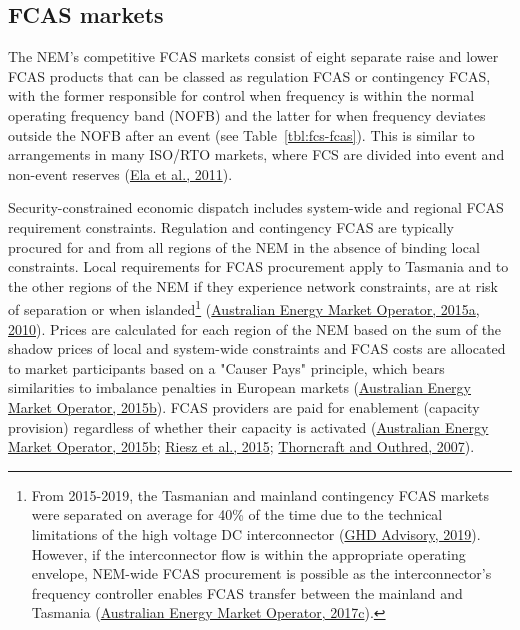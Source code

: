 \documentclass[12pt,a4paper,]{report}
\begin{document}
\hypertarget{fcas-markets}{%
\subsection{FCAS markets}\label{fcas-markets}}

The NEM's competitive FCAS markets consist of eight separate raise and
lower FCAS products that can be classed as regulation FCAS or
contingency FCAS, with the former responsible for control when frequency
is within the normal operating frequency band (NOFB) and the latter for
when frequency deviates outside the NOFB after an event (see
Table~\ref{tbl:fcs-fcas}). This is similar to arrangements in many
ISO/RTO markets, where FCS are divided into event and non-event reserves
(\protect\hyperlink{ref-elaOperatingReservesVariable2011}{Ela et al.,
2011}).

Security-constrained economic dispatch includes system-wide and regional
FCAS requirement constraints. Regulation and contingency FCAS are
typically procured for and from all regions of the NEM in the absence of
binding local constraints. Local requirements for FCAS procurement apply
to Tasmania and to the other regions of the NEM if they experience
network constraints, are at risk of separation or when
islanded\footnote{From 2015-2019, the Tasmanian and mainland contingency
  FCAS markets were separated on average for 40\% of the time due to the
  technical limitations of the high voltage DC interconnector
  (\protect\hyperlink{ref-ghdadvisoryGHDReportTasNetworks2019}{GHD
  Advisory, 2019}). However, if the interconnector flow is within the
  appropriate operating envelope, NEM-wide FCAS procurement is possible
  as the interconnector's frequency controller enables FCAS transfer
  between the mainland and Tasmania
  (\protect\hyperlink{ref-australianenergymarketoperatorInterconnectorCapabilitiesNational2017}{Australian
  Energy Market Operator, 2017c}).}
(\protect\hyperlink{ref-australianenergymarketoperatorConstraintImplementationGuidelines2015}{Australian
Energy Market Operator, 2015a},
\protect\hyperlink{ref-australianenergymarketoperatorConstraintFormulationGuidelines2010}{2010}).
Prices are calculated for each region of the NEM based on the sum of the
shadow prices of local and system-wide constraints and FCAS costs are
allocated to market participants based on a "Causer Pays" principle,
which bears similarities to imbalance penalties in European markets
(\protect\hyperlink{ref-australianenergymarketoperatorGuideAncillaryServices2015}{Australian
Energy Market Operator, 2015b}). FCAS providers are paid for enablement
(capacity provision) regardless of whether their capacity is activated
(\protect\hyperlink{ref-australianenergymarketoperatorGuideAncillaryServices2015}{Australian
Energy Market Operator, 2015b};
\protect\hyperlink{ref-rieszFrequencyControlAncillary2015}{Riesz et al.,
2015};
\protect\hyperlink{ref-thorncraftExperienceMarketbasedAncillary2007}{Thorncraft
and Outhred, 2007}).
\end{document}

